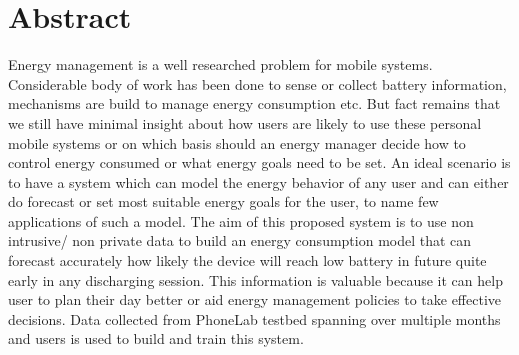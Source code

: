 \section*{Abstract}
Energy management is a well researched problem for mobile systems. Considerable body of work has been
done to sense or collect battery information, mechanisms are build to manage energy consumption etc.
But fact remains that we still have minimal insight about how users are likely to use these personal
mobile systems or on which basis should an energy manager decide how to control energy consumed or 
what energy goals need to be set. An ideal scenario is to have a system which can model the energy behavior
of any user and can either do forecast or set most suitable energy goals for the user, to name few
applications of such a model. The aim of this proposed system is to use non intrusive/ non private
data to build an energy consumption model that can forecast accurately how likely the device will
reach low battery in future quite early in any discharging session. This information is valuable
because it can help user to plan their day better or aid energy management policies to take effective
decisions. Data collected from PhoneLab testbed spanning over multiple months and users is used to
build and train this system.

